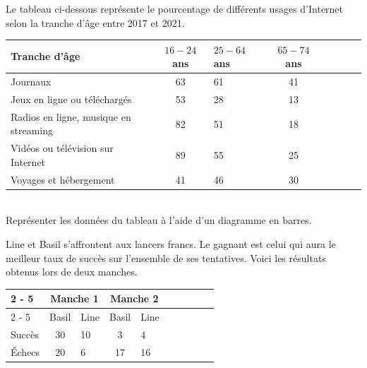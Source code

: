 \documentclass[11pt,a4paper]{article}  %
\begin{document}
Le tableau ci-dessous représente le pourcentage de différents usages d'Internet selon la tranche d'âge entre 2017 et 2021.\\
\begin{tabular}{|Xc|Xc|Xc|Xc|}
	\hline Tranche d'âge & $16-24$ ans & $25-64$ ans & $65-74$ ans \\
	\hline Journaux & 63 & 61 & 41 \\
	\hline Jeux en ligne ou téléchargés & 53 & 28 & 13 \\
	\hline Radios en ligne, musique en streaming & 82 & 51 & 18 \\
	\hline Vidéos ou télévision sur Internet & 89 & 55 & 25 \\
	\hline Voyages et hébergement & 41 & 46 & 30 \\
	\hline
\end{tabular}\\
Représenter les données du tableau à l'aide d'un diagramme en barres.


Line et Basil s'affrontent aux lancers francs.
Le gagnant est celui qui aura le meilleur taux de succès sur l'ensemble de ses tentatives. Voici les résultats obtenus lors de deux manches.

\begin{tabular}{|Xc|Xc|Xc|Xc|Xc|}
	\cline { 2 - 5 }
	\multicolumn{1}{l|}{ } & \multicolumn{2}{c}{ Manche 1 } & \multicolumn{2}{c}{ Manche 2 }  \\
	\cline { 2 - 5 } \multicolumn{1}{l|}{ }  & Basil & Line & Basil & Line \\
	\hline Succès & 30 & 10 & 3 & 4 \\
	\hline Échecs & 20 & 6 & 17 & 16 \\
	\hline
\end{tabular}\\
\end{document}

